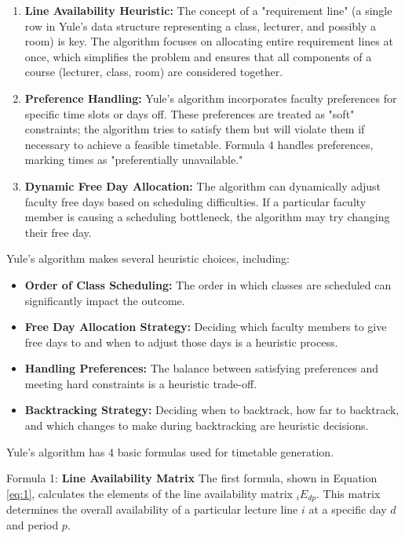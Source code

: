\begin{enumerate}[label=\alph*.]
    \item \textbf{Line Availability Heuristic:} The concept of a "requirement line" (a single row in Yule's data structure representing a class, lecturer, and possibly a room) is key.
	The algorithm focuses on allocating entire requirement lines at once, which simplifies the problem and ensures that all components of a course (lecturer, class, room) are considered together.

    \item \textbf{Preference Handling:} Yule's algorithm incorporates faculty preferences for specific time slots or days off.
	These preferences are treated as "soft" constraints; the algorithm tries to satisfy them but will violate them if necessary to achieve a feasible timetable.
	Formula 4 handles preferences, marking times as "preferentially unavailable."

    \item \textbf{Dynamic Free Day Allocation:} The algorithm can dynamically adjust faculty free days based on scheduling difficulties.
	If a particular faculty member is causing a scheduling bottleneck, the algorithm may try changing their free day.
\end{enumerate}

Yule's algorithm makes several heuristic choices, including:

\begin{itemize}
    \item \textbf{Order of Class Scheduling:} The order in which classes are scheduled can significantly impact the outcome.
    \item \textbf{Free Day Allocation Strategy:} Deciding which faculty members to give free days to and when to adjust those days is a heuristic process.
    \item \textbf{Handling Preferences:} The balance between satisfying preferences and meeting hard constraints is a heuristic trade-off.
    \item \textbf{Backtracking Strategy:} Deciding when to backtrack, how far to backtrack, and which changes to make during backtracking are heuristic decisions.
\end{itemize}

Yule's algorithm has 4 basic formulas used for timetable generation.

Formula 1: \textbf{Line Availability Matrix} The first formula, shown in Equation \ref{eq:1}, calculates the elements of the line availability matrix \( _iE_{dp} \).
This matrix determines the overall availability of a particular lecture line \( i \) at a specific day \( d \) and period \( p \).

